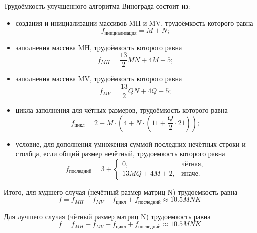 Трудоёмкость улучшенного алгоритма Винограда состоит из:
\begin{itemize}
	\item создания и инициализации массивов MH и MV, трудоёмкость которого равна
	\begin{equation}
		\label{for:impr_init}
		f_{инициализация} = M + N;
	\end{equation}
	
	\item заполнения массива MH, трудоёмкость которого равна
	\begin{equation}
		\label{for:impr_MH}
		f_{MH} =  \frac{13}{2}MN + 4M + 5;
	\end{equation}
	
	\item заполнения массива MV, трудоёмкость которого равна
	\begin{equation}
		\label{for:impr_MV}
		f_{MV} =  \frac{13}{2}QN + 4Q + 5;
	\end{equation}
	
	\item цикла заполнения для чётных размеров, трудоёмкость которого равна
	\begin{equation}
		\label{for:impr_cycle}
		f_{\text{цикл}} =2 + M \cdot (4 + N \cdot (11 + \frac{Q}{2} \cdot 21));
	\end{equation}
	
	\item условие, для дополнения умножения суммой последних нечётных строки и столбца, если общий размер нечётный, трудоемкость которого равна
	\begin{equation}
		\label{for:impr_last}
		f_{\text{последний}} = 3 + 
		\begin{cases}
			0, & \text{чётная,}\\
			13MQ + 4M + 2, & \text{иначе.}
		\end{cases}
	\end{equation}
\end{itemize}

Итого, для худшего случая (нечётный размер матриц N) трудоемкость равна
\begin{equation}
	\label{for:bad_impr}
	f = f_{MH} + f_{MV} + f_{\text{цикл}} + f_{\text{последний}} \approx 10.5MNK
\end{equation}

Для лучшего случая (чётный размер матриц N) трудоемкость равна
\begin{equation}
	\label{for:good_impr}
	f = f_{MH} + f_{MV} + f_{\text{цикл}} + f_{\text{последний}} \approx 10.5MNK
\end{equation}

